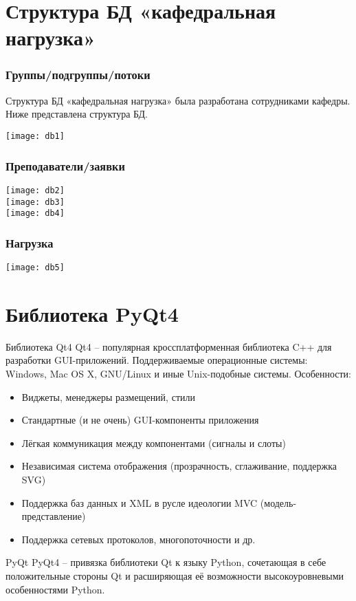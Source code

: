 \documentclass[10pt,utf8,presentation,notheorems,xcolor=dvipsnames,compress]{beamer}
\begin{document}
\section{Структура БД «кафедральная нагрузка»}
\begin{frame}
\frametitle{Группы/подгруппы/потоки}
Структура БД «кафедральная нагрузка» была разработана
сотрудниками кафедры. Ниже представлена структура БД.
\begin{center}
\texttt{[image: db1]}%
\end{center}
\end{frame}

\begin{frame}
\frametitle{Преподаватели/заявки}
\begin{center}
\texttt{[image: db2]}\\
\texttt{[image: db3]}\\
\texttt{[image: db4]}%
\end{center}
\end{frame}

\begin{frame}
\frametitle{Нагрузка}
\begin{center}
\vskip -1cm
\texttt{[image: db5]}%
\end{center}
\end{frame}

\section{Библиотека PyQt4}
\begin{frame}
\begin{block}{Библиотека Qt4}
Qt4 -- популярная кроссплатформенная библиотека C++ для разработки GUI-приложений. Поддерживаемые операционные системы: Windows, Mac OS X, GNU/Linux и иные Unix-подобные системы. Особенности:
\begin{itemize}
 \item Виджеты, менеджеры размещений, стили
 \item Стандартные (и не очень) GUI-компоненты приложения
 \item Лёгкая коммуникация между компонентами (сигналы и слоты)
 \item Независимая система отображения (прозрачность, сглаживание, поддержка SVG)
 \item Поддержка баз данных и XML в русле идеологии MVC (модель-представление)
 \item Поддержка сетевых протоколов, многопоточности и др.
\end{itemize}
\end{block}
\begin{block}{PyQt}
PyQt4 -- привязка библиотеки Qt к языку Python, сочетающая в себе положительные стороны Qt и расширяющая её возможности высокоуровневыми особенностями Python.
\end{block}
\end{frame}
\end{document}
